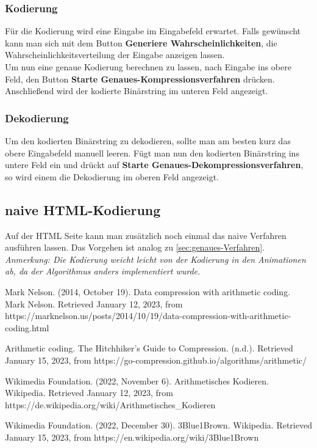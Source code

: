 \documentclass[a4paper]{article}
\theoremstyle{definition}
\theoremstyle{remark}
\begin{document}
\subsubsection{Kodierung}
Für die Kodierung wird eine Eingabe im Eingabefeld erwartet. Falls gewünscht kann man sich mit dem Button \textbf{Generiere Wahrscheinlichkeiten}, die Wahrscheinlichkeitsverteilung der Eingabe anzeigen lassen.
\\
Um nun eine genaue Kodierung berechnen zu lassen, nach Eingabe ins obere Feld, den Button \textbf{Starte Genaues-Kompressionsverfahren} drücken.
\\
Anschließend wird der kodierte Binärstring im unteren Feld angezeigt.\\

\subsubsection{Dekodierung}
Um den kodierten Binärstring zu dekodieren, sollte man am besten kurz das obere Eingabefeld manuell leeren. Fügt man nun den kodierten Binärstring ins untere Feld ein und drückt auf \textbf{Starte Genaues-Dekompressionsverfahren}, so wird einem die Dekodierung im oberen Feld angezeigt.


\subsection{naive HTML-Kodierung}
Auf der HTML Seite kann man zusätzlich noch einmal das naive Verfahren ausführen lassen. Das Vorgehen ist analog zu \ref{sec:genaues-Verfahren}.\\
\textit{Anmerkung: Die Kodierung weicht leicht von der Kodierung in den Animationen ab, da der Algorithmus anders implementiert wurde.}


	
	
	

		
		\newpage
	
	\begin{thebibliography}{2}
		 Mark Nelson. (2014, October 19). Data compression with arithmetic coding. Mark Nelson. Retrieved January 12, 2023, from https://marknelson.us/posts/2014/10/19/data-compression-with-arithmetic-coding.html 

 Arithmetic coding. The Hitchhiker's Guide to Compression. (n.d.). Retrieved January 15, 2023, from https://go-compression.github.io/algorithms/arithmetic/ 
		
		 Wikimedia Foundation. (2022, November 6). Arithmetisches Kodieren. Wikipedia. Retrieved January 12, 2023, from https://de.wikipedia.org/wiki/Arithmetisches\_Kodieren
	
		 Wikimedia Foundation. (2022, December 30). 3Blue1Brown. Wikipedia. Retrieved January 15, 2023, from https://en.wikipedia.org/wiki/3Blue1Brown 
		
			\end{thebibliography}
\end{document}
